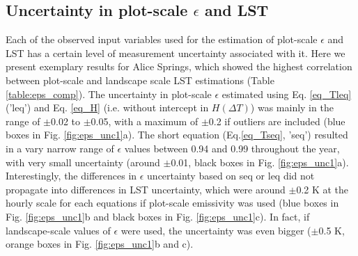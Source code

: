 \documentclass[fleqn,10pt]{wlscirep}
\begin{document}
\subsection{Uncertainty in plot-scale $\epsilon$ and LST}
Each of the observed input variables used for the estimation of plot-scale $\epsilon$ and LST has a certain level of measurement uncertainty associated with it. Here we present exemplary results for Alice Springs, which showed the highest correlation between plot-scale and landscape scale LST estimations (Table \ref{table:eps_comp}).%
The uncertainty in plot-scale $\epsilon$ estimated using Eq. \ref{eq_Tleq} ('leq') and Eq. \ref{eq_H} (i.e. without intercept in $H(\Delta  T)$) was mainly in the range of $\pm$0.02 to $\pm$0.05, with a maximum of $\pm$0.2 if outliers are included (blue boxes in Fig. \ref{fig:eps_unc1}a).
The short equation (Eq.\ref{eq_Tseq}, 'seq') resulted in a vary narrow range of $\epsilon$ values between 0.94 and 0.99 throughout the year, with very small uncertainty (around $\pm$0.01, black boxes in Fig. \ref{fig:eps_unc1}a). %
Interestingly, the differences in $\epsilon$ uncertainty based on seq or leq did not propagate into differences in LST uncertainty, which were around $\pm$0.2 K at the hourly scale for each equations if plot-scale emissivity was used (blue boxes in Fig. \ref{fig:eps_unc1}b and black boxes in Fig. \ref{fig:eps_unc1}c). In fact, if landscape-scale values of $\epsilon$ were used, the uncertainty was even bigger ($\pm$0.5 K, orange boxes in Fig. \ref{fig:eps_unc1}b and c).
 
\end{document}
